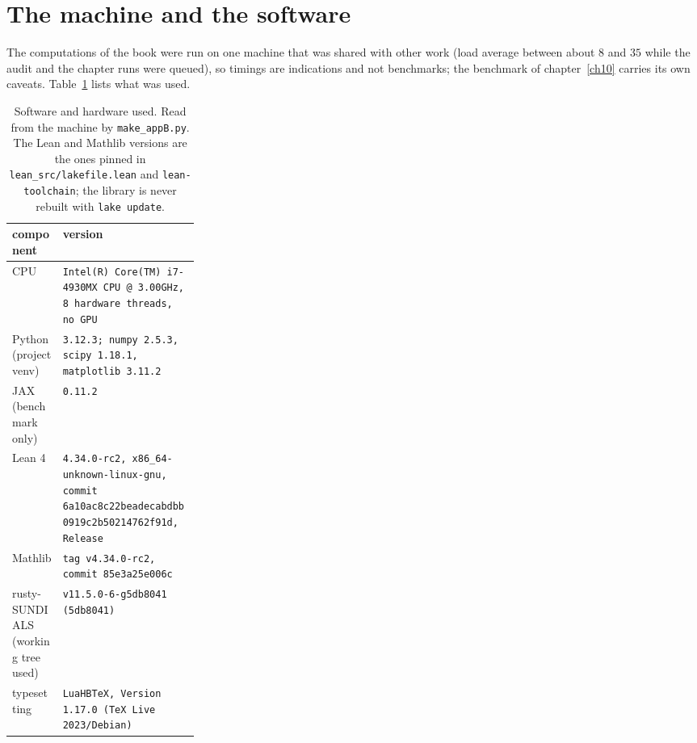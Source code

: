 \section{The machine and the software}
The computations of the book were run on one machine that was shared with other work (load average between about $8$ and $35$ while the audit and the chapter runs were queued), so timings are indications and not benchmarks; the benchmark of chapter~\ref{ch10} carries its own caveats. Table~\ref{appB:tab-versions} lists what was used.
\begin{table}[h]\centering\small\renewcommand{\arraystretch}{1.1}\begin{tabularx}{\linewidth}{@{}>{\raggedright}p{0.27\linewidth}>{\raggedright\arraybackslash}X@{}}\toprule component & version\\\midrule
CPU & \texttt{Intel(R) Core(TM) i7-\allowbreak{}4930MX CPU @ 3.\allowbreak{}00GHz,\allowbreak{} 8 hardware threads,\allowbreak{} no GPU} \\
Python (project venv) & \texttt{3.\allowbreak{}12.\allowbreak{}3; numpy 2.\allowbreak{}5.\allowbreak{}3,\allowbreak{} scipy 1.\allowbreak{}18.\allowbreak{}1,\allowbreak{} matplotlib 3.\allowbreak{}11.\allowbreak{}2} \\
JAX (benchmark only) & \texttt{0.\allowbreak{}11.\allowbreak{}2} \\
Lean 4 & \texttt{4.\allowbreak{}34.\allowbreak{}0-\allowbreak{}rc2,\allowbreak{} x86\_\allowbreak{}64-\allowbreak{}unknown-\allowbreak{}linux-\allowbreak{}gnu,\allowbreak{} commit 6a10ac8c22beadecabdbb0919c2b50214762f91d,\allowbreak{} Release} \\
Mathlib & \texttt{tag v4.\allowbreak{}34.\allowbreak{}0-\allowbreak{}rc2,\allowbreak{} commit 85e3a25e006c} \\
rusty-\allowbreak{}SUNDIALS (working tree used) & \texttt{v11.\allowbreak{}5.\allowbreak{}0-\allowbreak{}6-\allowbreak{}g5db8041 (5db8041)} \\
typesetting & \texttt{LuaHBTeX,\allowbreak{} Version 1.\allowbreak{}17.\allowbreak{}0 (TeX Live 2023/\allowbreak{}Debian)} \\
\bottomrule\end{tabularx}\caption{Software and hardware used. Read from the machine by \texttt{make\_appB.py}. The Lean and Mathlib versions are the ones pinned in \texttt{lean\_\allowbreak{}src/\allowbreak{}lakefile.\allowbreak{}lean} and \texttt{lean-toolchain}; the library is never rebuilt with \texttt{lake update}.}\label{appB:tab-versions}\end{table}
